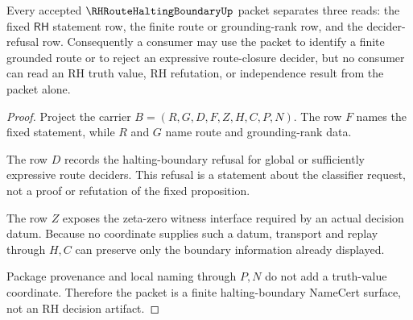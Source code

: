\begin{theorem}
\label{thm:rh-route-halting-boundary-nondecision}
Every accepted $\RHRouteHaltingBoundaryUp$ packet separates three reads: the fixed $\mathsf{RH}$ statement row, the finite route or grounding-rank row, and the decider-refusal row. Consequently a consumer may use the packet to identify a finite grounded route or to reject an expressive route-closure decider, but no consumer can read an RH truth value, RH refutation, or independence result from the packet alone.
\end{theorem}
\begin{proof}
Project the carrier $B=(R,G,D,F,Z,H,C,P,N)$. The row $F$ names the fixed statement, while $R$ and $G$ name route and grounding-rank data.

The row $D$ records the halting-boundary refusal for global or sufficiently expressive route deciders. This refusal is a statement about the classifier request, not a proof or refutation of the fixed proposition.

The row $Z$ exposes the zeta-zero witness interface required by an actual decision datum. Because no coordinate supplies such a datum, transport and replay through $H,C$ can preserve only the boundary information already displayed.

Package provenance and local naming through $P,N$ do not add a truth-value coordinate. Therefore the packet is a finite halting-boundary NameCert surface, not an RH decision artifact.
\end{proof}


\begin{closurestatus}{\RHRouteHaltingBoundaryUp}
  \theoryclosure{\seedClosure}
  \formalstatus{\unformalizedV}
\end{closurestatus}
